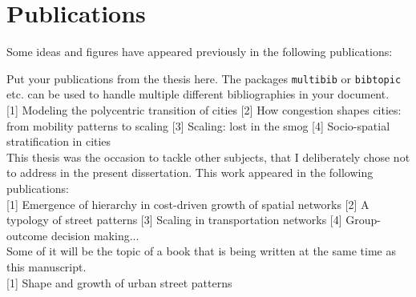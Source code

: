 

\chapter*{Publications} %

Some ideas and figures have appeared previously in the following publications:

\bigskip

\noindent Put your publications from the thesis here. The packages
\texttt{multibib} or \texttt{bibtopic} etc. can be used to handle multiple
different bibliographies in your document.\\

[1] Modeling the polycentric transition of cities
[2] How congestion shapes cities: from mobility patterns to scaling
[3] Scaling: lost in the smog
[4] Socio-spatial stratification in cities\\

This thesis was the occasion to tackle other subjects, that I deliberately chose
not to address in the present dissertation. This work appeared in the following
publications:\\

[1] Emergence of hierarchy in cost-driven growth of spatial networks
[2] A typology of street patterns
[3] Scaling in transportation networks
[4] Group-outcome decision making...\\

Some of it will be the topic of a book that is being written at the same time as
this manuscript.\\

[1] Shape and growth of urban street patterns
